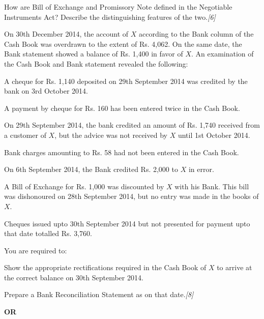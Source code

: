 \documentclass[11pt,a4paper]{article}
\newcommand{\pts}[1]{\hfill   \textit{[#1]}}
\begin{document}
\begin{parts}
  \item How are Bill of Exchange and Promissory Note defined in the Negotiable Instruments Act? Describe the distinguishing features of the two.\pts{6}
  \item On 30th December 2014, the account of $X$ according to the Bank column of the Cash Book was overdrawn to the extent of Rs. 4,062. On the same date, the Bank statement showed a balance of Rs. 1,400 in favor of $X$. An examination of the Cash Book and Bank statement revealed the following:
  
\begin{parts}
    \item A cheque for Rs. 1,140 deposited on 29th September 2014 was credited by the bank on 3rd October 2014.
    \item A payment by cheque for Rs. 160 has been entered twice in the Cash Book.
    \item On 29th September 2014, the bank credited an amount of Rs. 1,740 received from a customer of $X$, but the advice was not received by $X$ until 1st October 2014.
    \item Bank charges amounting to Rs. 58 had not been entered in the Cash Book.
    \item On 6th September 2014, the Bank credited Rs. 2,000 to $X$ in error.
    \item A Bill of Exchange for Rs. 1,000 was discounted by $X$ with his Bank. This bill was dishonoured on 28th September 2014, but no entry was made in the books of $X$.
    \item Cheques issued upto 30th September 2014 but not presented for payment upto that date totalled Rs. 3,760.
  \end{parts}
  You are required to:
  
\begin{parts}
    \item Show the appropriate rectifications required in the Cash Book of $X$ to arrive at the correct balance on 30th September 2014.
    \item Prepare a Bank Reconciliation Statement as on that date.\pts{8}
  \end{parts}
\end{parts}

\centerline{   \textbf{OR}}
\end{document}

